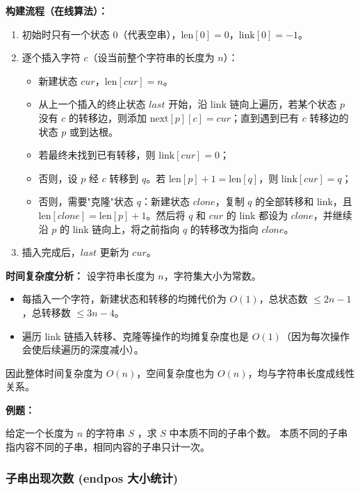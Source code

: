\textbf{构建流程（在线算法）：}
\begin{enumerate}
  \item 初始时只有一个状态 $0$（代表空串），$\text{len}[0]=0$，$\text{link}[0]=-1$。
  \item 逐个插入字符 $c$（设当前整个字符串的长度为 $n$）：
    \begin{itemize}
      \item 新建状态 $cur$，$\text{len}[cur] = n$。
      \item 从上一个插入的终止状态 $last$ 开始，沿 link 链向上遍历，若某个状态 $p$ 没有 $c$ 的转移边，则添加 $\text{next}[p][c] = cur$；直到遇到已有 $c$ 转移边的状态 $p$ 或到达根。
      \item 若最终未找到已有转移，则 $\text{link}[cur] = 0$；
      \item 否则，设 $p$ 经 $c$ 转移到 $q$。若 $\text{len}[p] + 1 = \text{len}[q]$，则 $\text{link}[cur] = q$；
      \item 否则，需要"克隆"状态 $q$：新建状态 $clone$，复制 $q$ 的全部转移和 link，且 $\text{len}[clone] = \text{len}[p] + 1$。然后将 $q$ 和 $cur$ 的 link 都设为 $clone$，并继续沿 $p$ 的 link 链向上，将之前指向 $q$ 的转移改为指向 $clone$。
    \end{itemize}
  \item 插入完成后，$last$ 更新为 $cur$。
\end{enumerate}

\textbf{时间复杂度分析：}
设字符串长度为 $n$，字符集大小为常数。
\begin{itemize}
  \item 每插入一个字符，新建状态和转移的均摊代价为 $O(1)$，总状态数 $\leq 2n-1$，总转移数 $\leq 3n-4$。
  \item 遍历 link 链插入转移、克隆等操作的均摊复杂度也是 $O(1)$（因为每次操作会使后续遍历的深度减小）。
\end{itemize}
因此整体时间复杂度为 $O(n)$，空间复杂度也为 $O(n)$，均与字符串长度成线性关系。

\textbf{例题：}

给定一个长度为 $n$ 的字符串 $S$ ，求 $S$ 中本质不同的子串个数。
本质不同的子串指内容不同的子串，相同内容的子串只计一次。



\subsubsection{子串出现次数 (endpos 大小统计)}

